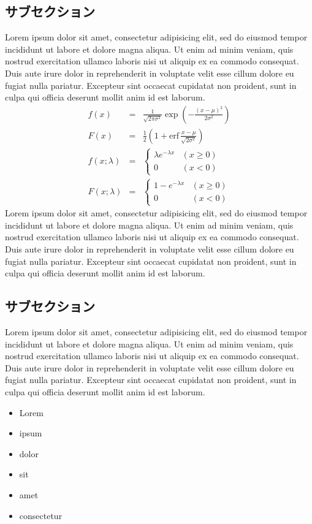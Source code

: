 \documentclass[a4j,10pt, twocolumn]{jarticle}
\begin{document}
\subsection{サブセクション}
Lorem ipsum dolor sit amet, consectetur adipisicing elit, sed do eiusmod tempor incididunt ut labore et dolore magna aliqua. Ut enim ad minim veniam, quis nostrud exercitation ullamco laboris nisi ut aliquip ex ea commodo consequat. Duis aute irure dolor in reprehenderit in voluptate velit esse cillum dolore eu fugiat nulla pariatur. Excepteur sint occaecat cupidatat non proident, sunt in culpa qui officia deserunt mollit anim id est laborum.
\begin{eqnarray*}
f(x)&=&\frac{1}{\sqrt{2\pi\sigma^{2}}} \exp\!\left(-\frac{(x-\mu)^2}{2\sigma^2} \right) \\
F(x)&=&\frac12 \left(1 + \mathrm{erf}\,\frac{x-\mu}{\sqrt{2\sigma^{2} } }\right) \\
f(x; \lambda) &=& \left\{ \begin{array}{ll} \lambda e^{-\lambda x} & (x \geq 0) \\ 0 & (x < 0)\end{array}\right.  \\
F(x; \lambda) &=& \left\{ \begin{array}{ll} 1 - e^{-\lambda x} & (x \geq 0) \\ 0 & (x < 0)\end{array}\right.
\end{eqnarray*}
Lorem ipsum dolor sit amet, consectetur adipisicing elit, sed do eiusmod tempor incididunt ut labore et dolore magna aliqua. Ut enim ad minim veniam, quis nostrud exercitation ullamco laboris nisi ut aliquip ex ea commodo consequat. Duis aute irure dolor in reprehenderit in voluptate velit esse cillum dolore eu fugiat nulla pariatur. Excepteur sint occaecat cupidatat non proident, sunt in culpa qui officia deserunt mollit anim id est laborum.

\subsection{サブセクション}
Lorem ipsum dolor sit amet, consectetur adipisicing elit, sed do eiusmod tempor incididunt ut labore et dolore magna aliqua. Ut enim ad minim veniam, quis nostrud exercitation ullamco laboris nisi ut aliquip ex ea commodo consequat. Duis aute irure dolor in reprehenderit in voluptate velit esse cillum dolore eu fugiat nulla pariatur. Excepteur sint occaecat cupidatat non proident, sunt in culpa qui officia deserunt mollit anim id est laborum.
\begin{itemize}
\item Lorem
\item ipsum
\item dolor
\item sit
\item amet
\item consectetur
\end{itemize}
\end{document}
